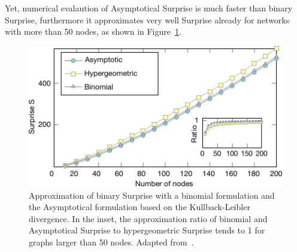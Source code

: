Yet, numerical evalaution of Asymptotical Surprise is much faster than binary Surprise, furthermore it approximates very well Surprise already for networks with more than 50 nodes, as shown in Figure~\ref{fig:asymptotical_surprise_comparison}.

\begin{figure}[htb!]
\centering
\includegraphics[width=1\textwidth]{images/asymptotical_surprise_comparison.pdf}
\caption{Approximation of binary Surprise with a binomial formulation and the Asymptotical formulation based on the Kullback-Leibler divergence. In the inset, the approximation ratio of binomial and Asymptotical Surprise to hypergeometric Surprise tends to 1 for graphs larger than 50 nodes. Adapted from~\cite{traag2015}.}
\label{fig:asymptotical_surprise_comparison}
\end{figure}


